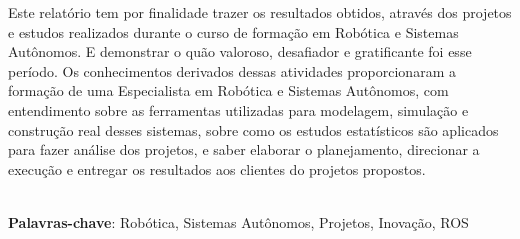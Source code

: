 \begin{thesisresumo}

Este relatório tem por finalidade trazer os resultados obtidos, através dos projetos e estudos realizados durante o curso de formação em Robótica e Sistemas Autônomos. E demonstrar o quão valoroso, desafiador e gratificante foi esse período. Os conhecimentos derivados dessas atividades proporcionaram a formação de uma Especialista em Robótica e Sistemas Autônomos, com entendimento sobre as ferramentas utilizadas para modelagem, simulação e construção real desses sistemas, sobre como os estudos estatísticos são aplicados para fazer análise dos projetos, e saber elaborar o planejamento, direcionar a execução e entregar os resultados aos clientes do projetos propostos. 



\ \\


\textbf{Palavras-chave}: Robótica, Sistemas Autônomos, Projetos, Inovação, ROS

\end{thesisresumo}
